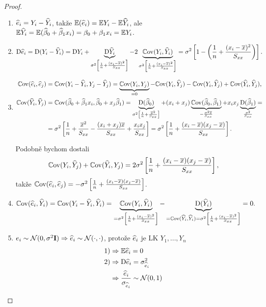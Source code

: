 \begin{proof}
\begin{enumerate}
	\item $\hei = Y_i - \hYi$, takže $\E(\hei) = \E Y_i - \E \hYi$, ale $\E \hYi = \E(\model) = \beta_0 + \beta_1 x_i = \E Y_i$.
	\item
	 $$
		\D \hei = \D (Y_i - \hYi) = \D Y_i + \underbrace{\D \hYi}_{\sigma^2 \left[\frac{1}{n} + \frac{(x_i - \hx)^2}{\Sxx} \right]} - 2 \underbrace{\Cov(Y_i, \hYi)}_{\sigma^2 \left[\frac{1}{n} + \frac{(x_i - \hx)^2}{\Sxx} \right]} = \sigma^2 \left[1 - \left(\frac{1}{n} + \frac{(x_i - \hx)^2}{\Sxx} \right) \right].
	 $$
	\item
	\begin{align*}
		\Cov(\hei, \hej) & = \Cov(Y_i - \hYi, Y_j - \hYj) = \underbrace{\Cov(Y_i, Y_j)}_{ = 0} - \Cov(Y_i, \hYj) - \Cov(Y_i, \hYj) + \Cov(\hYi, \hYj), \\
		\Cov(\hYi, \hYj) & = \Cov(\model, \wbeta_0 + x_j \wbeta_1) = \underbrace{\D(\wbeta_0)}_{\sigma^2 \left[\frac{1}{n} + \frac{\hx^2}{\Sxx} \right]} + (x_i + x_j) \underbrace{\Cov (\wbeta_0,\wbeta_1)}_{-\frac{\sigma^2 \hx}{\Sxx}} + x_i x_j \underbrace{\D(\wbeta_1)}_{\frac{\sigma^2}{\Sxx}} = \\
		& = \sigma^2 \left[\frac{1}{n} + \frac{\hx^2}{\Sxx} - \frac{(x_i + x_j) \hx}{\Sxx} + \frac{x_i x_j}{\Sxx}\right] = \sigma^2 \left[\frac{1}{n} + \frac{(x_i - \hx)(x_j - \hx)}{\Sxx} \right].
	\end{align*}
	
	Podobně bychom dostali
	 $$
		\Cov(Y_i, \hYj) + \Cov(\hYi, Y_j) = 2 \sigma^2 \left[\frac{1}{n} + \frac{(x_i - \hx)(x_j - \hx)}{\Sxx} \right],
	 $$
	takže $\Cov(\hei, \hej) = - \sigma^2 \left[\frac{1}{n} + \frac{(x_i - \hx)(x_j - \hx)}{\Sxx} \right]$.
	\item
	 $$
		\Cov(\hei, \hYi) = \Cov(Y_i - \hYi, \hYi) = \underbrace{\Cov(Y_i, \hYi)}_{ = \sigma^2 \left[\frac{1}{n} + \frac{(x_i - \hx)^2}{\Sxx} \right]} - \underbrace{\D(\hYi)}_{ = \Cov(\hYi, \hYi) = \sigma^2 \left[\frac{1}{n} + \frac{(x_i - \hx)^2}{\Sxx} \right]} = 0.
	 $$
	\item $e_i \sim \Nn \Rightarrow \hei \sim \NN(\cdot, \cdot)$, protože $\hei$ je LK $Y_1,..., Y_n$
	\begin{align*}
		\text{1)} & \Rightarrow \E \hei = 0 \\
		\text{2)} & \Rightarrow \D \hei = \sigma_{\hei}^2 \\
	 			  & \Rightarrow \frac{\hei}{\sigma_{\hei}} \sim \NN(0,1)
	\end{align*}
	\end{enumerate}
\end{proof}

